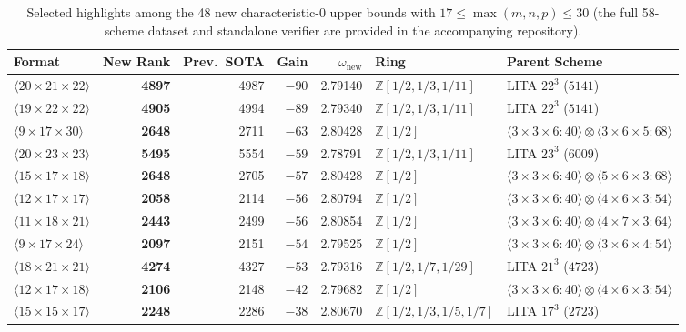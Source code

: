 \documentclass[11pt,a4paper]{article}
\begin{document}
\begin{table}[ht]
\centering
\caption{Selected highlights among the 48 new characteristic-$0$ upper bounds with $17\le \max(m,n,p)\le 30$ (the full 58-scheme dataset and standalone verifier are provided in the accompanying repository).}
\footnotesize
\setlength{\tabcolsep}{4pt}
\begin{tabular}{@{}lrrrrll@{}}
\toprule
Format & New Rank & Prev.\ SOTA & Gain & $\omega_{\text{new}}$ & Ring & Parent Scheme \\
\midrule
$\langle 20\times 21\times 22\rangle$ & \textbf{4897} & 4987 & $-90$ & 2.79140 & $\mathbb{Z}[1/2,1/3,1/11]$ & LITA $22^3$ ($5141$) \\
$\langle 19\times 22\times 22\rangle$ & \textbf{4905} & 4994 & $-89$ & 2.79340 & $\mathbb{Z}[1/2,1/3,1/11]$ & LITA $22^3$ ($5141$) \\
$\langle 9\times 17\times 30\rangle$  & \textbf{2648} & 2711 & $-63$ & 2.80428 & $\mathbb{Z}[1/2]$ & $\langle 3\times 3\times 6:40\rangle \otimes \langle 3\times 6\times 5:68\rangle$ \\
$\langle 20\times 23\times 23\rangle$ & \textbf{5495} & 5554 & $-59$ & 2.78791 & $\mathbb{Z}[1/2,1/3,1/11]$ & LITA $23^3$ ($6009$) \\
$\langle 15\times 17\times 18\rangle$ & \textbf{2648} & 2705 & $-57$ & 2.80428 & $\mathbb{Z}[1/2]$ & $\langle 3\times 3\times 6:40\rangle \otimes \langle 5\times 6\times 3:68\rangle$ \\
$\langle 12\times 17\times 17\rangle$ & \textbf{2058} & 2114 & $-56$ & 2.80794 & $\mathbb{Z}[1/2]$ & $\langle 3\times 3\times 6:40\rangle \otimes \langle 4\times 6\times 3:54\rangle$ \\
$\langle 11\times 18\times 21\rangle$ & \textbf{2443} & 2499 & $-56$ & 2.80854 & $\mathbb{Z}[1/2]$ & $\langle 3\times 3\times 6:40\rangle \otimes \langle 4\times 7\times 3:64\rangle$ \\
$\langle 9\times 17\times 24\rangle$  & \textbf{2097} & 2151 & $-54$ & 2.79525 & $\mathbb{Z}[1/2]$ & $\langle 3\times 3\times 6:40\rangle \otimes \langle 3\times 6\times 4:54\rangle$ \\
$\langle 18\times 21\times 21\rangle$ & \textbf{4274} & 4327 & $-53$ & 2.79316 & $\mathbb{Z}[1/2,1/7,1/29]$ & LITA $21^3$ ($4723$) \\
$\langle 12\times 17\times 18\rangle$ & \textbf{2106} & 2148 & $-42$ & 2.79682 & $\mathbb{Z}[1/2]$ & $\langle 3\times 3\times 6:40\rangle \otimes \langle 4\times 6\times 3:54\rangle$ \\
$\langle 15\times 15\times 17\rangle$ & \textbf{2248} & 2286 & $-38$ & 2.80670 & $\mathbb{Z}[1/2,1/3,1/5,1/7]$ & LITA $17^3$ ($2723$) \\

\end{tabular}
\end{table}
\end{document}
